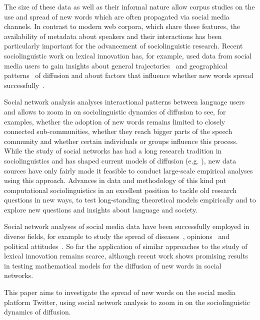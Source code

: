 \documentclass[
  a4paper,
  ]{scrartcl}
\begin{document}

  The size of these data as well as their informal nature allow corpus studies on the use and spread of new words which are often propagated via social media channels. In contrast to modern web corpora, which share these features, the availability of metadata about speakers and their interactions has been particularly important for the advancement of sociolinguistic research. Recent sociolinguistic work on lexical innovation has, for example, used data from social media users to gain insights about general trajectories~\parencite{Nini2017} and geographical patterns~\parencite{Eisenstein2014,Grieve2017,Grieve2018} of diffusion and about factors that influence whether new words spread successfully~\parencite{Grieveforthcoming}.

  Social network analysis analyses interactional patterns between language users and allows to zoom in on sociolinguistic dynamics of diffusion to see, for examples, whether the adoption of new words remains limited to closely connected sub-communities, whether they reach bigger parts of the speech community and whether certain individuals or groups influence this process. While the study of social networks has had a long research tradition in sociolinguistics and has shaped current models of diffusion (e.g. \cite{Milroy1985}), new data sources have only fairly made it feasible to conduct large-scale empirical analyses using this approach. Advances in data and methodology of this kind put computational sociolinguistics in an excellent position to tackle old research questions in new ways, to test long-standing theoretical models empirically and to explore new questions and insights about language and society.

  Social network analyses of social media data have been successfully employed in diverse fields, for example to study the spread of diseases~\parencite{Lu2018}, opinions~\parencite{West2014} and political attitudes~\parencite{Pew-Research-Center2019}. So far the application of similar approaches to the study of lexical innovation remains scarce, although recent work shows promising results in testing mathematical models for the diffusion of new words in social networks.~\parencite{Goel2016}


  This paper aims to investigate the spread of new words on the social media platform Twitter, using social network analysis to zoom in on the sociolinguistic dynamics of diffusion.
\end{document}
